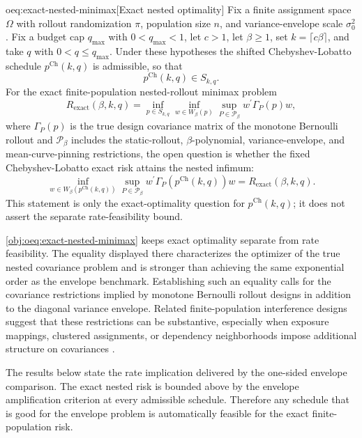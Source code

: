 \begin{remarkv}{oeq:exact-nested-minimax}[Exact nested optimality]
Fix a finite assignment space \(\Omega\) with rollout randomization \(\pi\), population size \(n\), and variance-envelope scale \(\sigma_0^2\). Fix a budget cap \(q_{\max}\) with \(0<q_{\max}<1\), let \(c>1\), let \(\beta\ge 1\), set \(k=\lceil c\beta\rceil\), and take \(q\) with \(0<q\le q_{\max}\). Under these hypotheses the shifted Chebyshev-Lobatto schedule \(p^{\mathrm{Ch}}(k,q)\) is admissible, so that
\[
p^{\mathrm{Ch}}(k,q)\in S_{k,q}.
\]
For the exact finite-population nested-rollout minimax problem
\[
R_{\mathrm{exact}}(\beta,k,q)
=
\inf_{p\in S_{k,q}}
\inf_{w\in W_\beta(p)}
\sup_{P\in\mathcal P_\beta}
w^\prime \Gamma_P(p) w,
\]
where \(\Gamma_P(p)\) is the true design covariance matrix of the monotone Bernoulli rollout and \(\mathcal P_\beta\) includes the static-rollout, \(\beta\)-polynomial, variance-envelope, and mean-curve-pinning restrictions, the open question is whether the fixed Chebyshev-Lobatto exact risk attains the nested infimum:
\[
\inf_{w\in W_\beta(p^{\mathrm{Ch}}(k,q))}
\sup_{P\in\mathcal P_\beta}
w^\prime \Gamma_P(p^{\mathrm{Ch}}(k,q)) w
=
R_{\mathrm{exact}}(\beta,k,q).
\]
This statement is only the exact-optimality question for \(p^{\mathrm{Ch}}(k,q)\); it does not assert the separate rate-feasibility bound.
\end{remarkv}

\cref{obj:oeq:exact-nested-minimax} keeps exact optimality separate from rate feasibility. The equality displayed there characterizes the optimizer of the true nested covariance problem and is stronger than achieving the same exponential order as the envelope benchmark. Establishing such an equality calls for the covariance restrictions implied by monotone Bernoulli rollout designs in addition to the diagonal variance envelope. Related finite-population interference designs suggest that these restrictions can be substantive, especially when exposure mappings, clustered assignments, or dependency neighborhoods impose additional structure on covariances \citep{cortezrodriguez2024,eichhorn2024,jiang2023,cai2023}.

The results below state the rate implication delivered by the one-sided envelope comparison. The exact nested risk is bounded above by the envelope amplification criterion at every admissible schedule. Therefore any schedule that is good for the envelope problem is automatically feasible for the exact finite-population risk.

